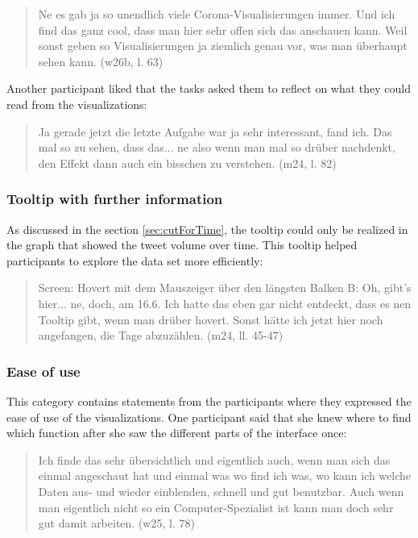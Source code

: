 \begin{quote}
    Ne es gab ja so unendlich viele Corona-Visualisierungen immer. Und ich find das ganz cool, dass man hier sehr offen sich das anschauen kann. Weil sonst geben so Visualisierungen ja ziemlich genau vor, was man überhaupt sehen kann. (w26b, l. 63)
\end{quote}

Another participant liked that the tasks asked them to reflect on what they could read from the visualizations:

\begin{quote}
    Ja gerade jetzt die letzte Aufgabe war ja sehr interessant, fand ich. Das mal so zu sehen, dass das... ne also wenn man mal so drüber nachdenkt, den Effekt dann auch ein bisschen zu verstehen. (m24, l. 82)
\end{quote}

\subsubsection*{Tooltip with further information}
As discussed in the section \ref{sec:cutForTime}, the tooltip could only be realized in the graph that showed the tweet volume over time. This tooltip helped participants to explore the data set more efficiently:

\begin{quote}
    Screen: Hovert mit dem Mauszeiger über den längsten Balken
    B: Oh, gibt's hier... ne, doch, am 16.6. Ich hatte das eben gar nicht entdeckt, dass es nen Tooltip gibt, wenn man drüber hovert. Sonst hätte ich jetzt hier noch angefangen, die Tage abzuzählen. (m24, ll. 45-47)
\end{quote}

\subsubsection*{Ease of use}
This category contains statements from the participants where they expressed the ease of use of the visualizations. One participant said that she knew where to find which function after she saw the different parts of the interface once:

\begin{quote}
    Ich finde das sehr übersichtlich und eigentlich auch, wenn man sich das einmal angeschaut hat und einmal was wo find ich was, wo kann ich welche Daten aus- und wieder einblenden, schnell und gut benutzbar. Auch wenn man eigentlich nicht so ein Computer-Spezialist ist kann man doch sehr gut damit arbeiten. (w25, l. 78)
\end{quote}

